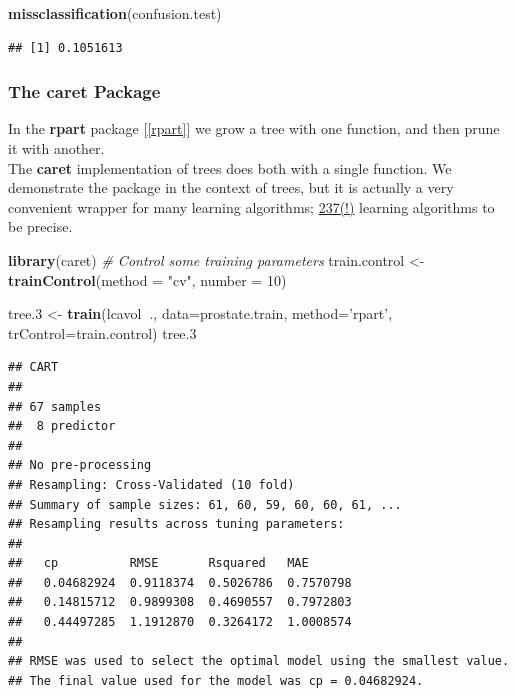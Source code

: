 \documentclass[]{book}
\newenvironment{Shaded}{\begin{snugshade}}{\end{snugshade}}
\newcommand{\KeywordTok}[1]{\textcolor[rgb]{0.13,0.29,0.53}{\textbf{#1}}}
\newcommand{\DataTypeTok}[1]{\textcolor[rgb]{0.13,0.29,0.53}{#1}}
\newcommand{\DecValTok}[1]{\textcolor[rgb]{0.00,0.00,0.81}{#1}}
\newcommand{\StringTok}[1]{\textcolor[rgb]{0.31,0.60,0.02}{#1}}
\newcommand{\CommentTok}[1]{\textcolor[rgb]{0.56,0.35,0.01}{\textit{#1}}}
\newcommand{\OperatorTok}[1]{\textcolor[rgb]{0.81,0.36,0.00}{\textbf{#1}}}
\newcommand{\NormalTok}[1]{#1}
\theoremstyle{definition}
\theoremstyle{definition}
\theoremstyle{definition}
\theoremstyle{remark}
\begin{document}
\begin{Shaded}
\begin{Highlighting}[]
\KeywordTok{missclassification}\NormalTok{(confusion.test)}
\end{Highlighting}
\end{Shaded}

\begin{verbatim}
## [1] 0.1051613
\end{verbatim}

\subsubsection{The caret Package}\label{caret}

In the \textbf{rpart} package {[}\ref{rpart}{]} we grow a tree with one
function, and then prune it with another.\\
The \textbf{caret} implementation of trees does both with a single
function. We demonstrate the package in the context of trees, but it is
actually a very convenient wrapper for many learning algorithms;
\href{http://topepo.github.io/caret/available-models.html\#}{237(!)}
learning algorithms to be precise.

\begin{Shaded}
\begin{Highlighting}[]
\KeywordTok{library}\NormalTok{(caret)}
\CommentTok{# Control some training parameters}
\NormalTok{train.control <-}\StringTok{ }\KeywordTok{trainControl}\NormalTok{(}\DataTypeTok{method =} \StringTok{"cv"}\NormalTok{,}
                           \DataTypeTok{number =} \DecValTok{10}\NormalTok{)}

\NormalTok{tree.}\DecValTok{3}\NormalTok{ <-}\StringTok{ }\KeywordTok{train}\NormalTok{(lcavol}\OperatorTok{~}\NormalTok{., }\DataTypeTok{data=}\NormalTok{prostate.train, }
                \DataTypeTok{method=}\StringTok{'rpart'}\NormalTok{, }
                \DataTypeTok{trControl=}\NormalTok{train.control)}
\NormalTok{tree.}\DecValTok{3}
\end{Highlighting}
\end{Shaded}

\begin{verbatim}
## CART 
## 
## 67 samples
##  8 predictor
## 
## No pre-processing
## Resampling: Cross-Validated (10 fold) 
## Summary of sample sizes: 61, 60, 59, 60, 60, 61, ... 
## Resampling results across tuning parameters:
## 
##   cp          RMSE       Rsquared   MAE      
##   0.04682924  0.9118374  0.5026786  0.7570798
##   0.14815712  0.9899308  0.4690557  0.7972803
##   0.44497285  1.1912870  0.3264172  1.0008574
## 
## RMSE was used to select the optimal model using the smallest value.
## The final value used for the model was cp = 0.04682924.
\end{verbatim}
\end{document}

